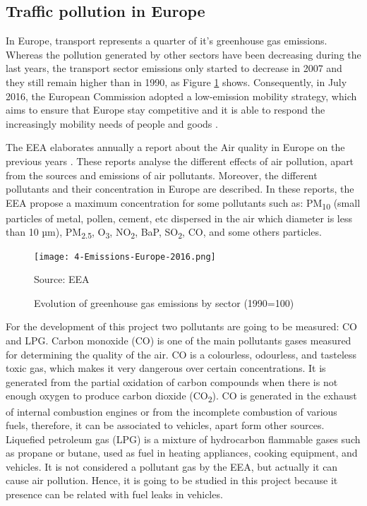 \subsection{Traffic pollution in Europe}
In Europe, transport represents a quarter of it's greenhouse gas emissions. Whereas the pollution generated by other sectors have been decreasing during the last years, the transport sector emissions only started to decrease in 2007 and they still remain higher than in 1990, as Figure \ref{fig:4-Emissions-Europe-2016} shows. Consequently, in July 2016, the European Commission adopted a low-emission mobility strategy, which aims to ensure that Europe stay competitive and it is able to respond the increasingly mobility needs of people and goods \cite{EuStrat}. 

The \acf{EEA} elaborates annually a report about the Air quality in Europe on the previous years \cite{AirQualityEEA17}. These reports analyse the different effects of air pollution, apart from the sources and emissions of air pollutants. Moreover, the different pollutants and their concentration in Europe are described. In these reports, the \ac{EEA} propose a maximum concentration for some pollutants such as: PM\textsubscript{10} (small particles of metal, pollen, cement, etc dispersed in the air which diameter is less than 10 µm), PM\textsubscript{2.5}, O\textsubscript{3}, NO\textsubscript{2}, BaP, SO\textsubscript{2}, CO, and some others particles.

\begin{figure}[!h]
	\begin{center}
		\texttt{[image: 4-Emissions-Europe-2016.png]}	
		\caption{Evolution of greenhouse gas emissions by sector (1990=100)}{Source: \acf{EEA}}
		\label{fig:4-Emissions-Europe-2016}
	\end{center}
\end{figure}

For the development of this project two pollutants are going to be measured: CO and LPG. Carbon monoxide (CO) is one of the main pollutants gases measured for determining the quality of the air. CO is a colourless, odourless, and tasteless toxic gas, which makes it very dangerous over certain concentrations. It is generated from the partial oxidation of carbon compounds when there is not enough oxygen to produce carbon dioxide (CO\textsubscript{2}). CO is generated in the exhaust of internal combustion engines or from the incomplete combustion of various fuels, therefore, it can be associated to vehicles, apart form other sources. Liquefied petroleum gas (LPG) is a mixture of hydrocarbon flammable gases such as propane or butane, used as fuel in heating appliances, cooking equipment, and vehicles. It is not considered a pollutant gas by the \ac{EEA}, but actually it can cause air pollution. Hence, it is going to be studied in this project because it presence can be related with fuel leaks in vehicles.

